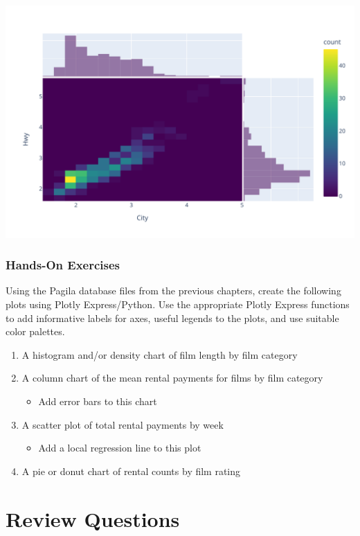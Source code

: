 \begin{center}
  \includegraphics[width=.8\textwidth]{px.heatmap.pdf}
\end{center}


\begin{tcolorbox}[colback=code]
\subsubsection*{Hands-On Exercises}

Using the Pagila database files from the previous chapters, create the following plots using Plotly Express/Python. Use the appropriate Plotly Express functions to add informative labels for axes, useful legends to the plots, and use suitable color palettes. 

\begin{enumerate}
   \item A histogram and/or density chart of film length by film category
   \item A column chart of the mean rental payments for films by film category
   \begin{itemize}
      \item Add error bars to this chart
   \end{itemize}
   \item A scatter plot of total rental payments by week
   \begin{itemize}
      \item Add a local regression line to this plot
   \end{itemize}
   \item A pie or donut chart of rental counts by film rating
\end{enumerate}
\end{tcolorbox}

\section{Review Questions}

